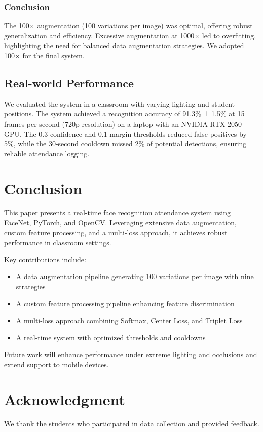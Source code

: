 \documentclass[conference]{IEEEtran}
\begin{document}
\subsubsection{Conclusion}
The 100× augmentation (100 variations per image) was optimal, offering robust generalization and efficiency. Excessive augmentation at 1000× led to overfitting, highlighting the need for balanced data augmentation strategies. We adopted 100× for the final system.

\subsection{Real-world Performance}
We evaluated the system in a classroom with varying lighting and student positions. The system achieved a recognition accuracy of 91.3\% ± 1.5\% at 15 frames per second (720p resolution) on a laptop with an NVIDIA RTX 2050 GPU. The 0.3 confidence and 0.1 margin thresholds reduced false positives by 5\%, while the 30-second cooldown missed 2\% of potential detections, ensuring reliable attendance logging.

\section{Conclusion}
This paper presents a real-time face recognition attendance system using FaceNet, PyTorch, and OpenCV. Leveraging extensive data augmentation, custom feature processing, and a multi-loss approach, it achieves robust performance in classroom settings.

Key contributions include:
\begin{itemize}
\item A data augmentation pipeline generating 100 variations per image with nine strategies
\item A custom feature processing pipeline enhancing feature discrimination
\item A multi-loss approach combining Softmax, Center Loss, and Triplet Loss
\item A real-time system with optimized thresholds and cooldowns
\end{itemize}

Future work will enhance performance under extreme lighting and occlusions and extend support to mobile devices.

\section*{Acknowledgment}
We thank the students who participated in data collection and provided feedback.
\end{document}
